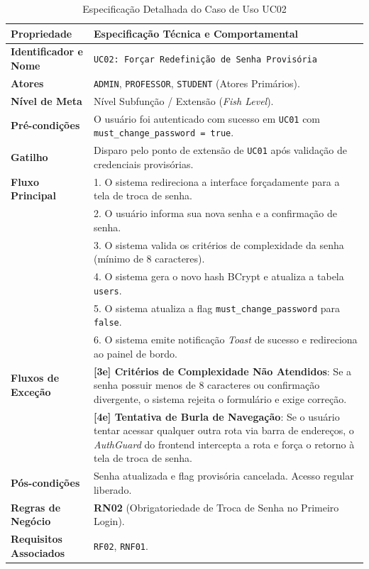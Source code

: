 \begin{table}[!ht]
\centering
\caption{Especificação Detalhada do Caso de Uso UC02}
\label{tab_uc02}
\footnotesize
\begin{tabularx}{\textwidth}{p{3.5cm} X}
\toprule
\textbf{Propriedade} & \textbf{Especificação Técnica e Comportamental} \\
\midrule
\textbf{Identificador e Nome} & \texttt{UC02: Forçar Redefinição de Senha Provisória} \\
\textbf{Atores} & \texttt{ADMIN}, \texttt{PROFESSOR}, \texttt{STUDENT} (Atores Primários). \\
\textbf{Nível de Meta} & Nível Subfunção / Extensão (\textit{Fish Level}). \\
\textbf{Pré-condições} & O usuário foi autenticado com sucesso em \texttt{UC01} com \texttt{must\_change\_password = true}. \\
\textbf{Gatilho} & Disparo pelo ponto de extensão de \texttt{UC01} após validação de credenciais provisórias. \\
\textbf{Fluxo Principal} & 
1. O sistema redireciona a interface forçadamente para a tela de troca de senha.\\
& 2. O usuário informa sua nova senha e a confirmação de senha.\\
& 3. O sistema valida os critérios de complexidade da senha (mínimo de 8 caracteres).\\
& 4. O sistema gera o novo hash BCrypt e atualiza a tabela \texttt{users}.\\
& 5. O sistema atualiza a flag \texttt{must\_change\_password} para \texttt{false}.\\
& 6. O sistema emite notificação \textit{Toast} de sucesso e redireciona ao painel de bordo. \\
\textbf{Fluxos de Exceção} & 
\textbf{[3e] Critérios de Complexidade Não Atendidos}: Se a senha possuir menos de 8 caracteres ou confirmação divergente, o sistema rejeita o formulário e exige correção.\\
& \textbf{[4e] Tentativa de Burla de Navegação}: Se o usuário tentar acessar qualquer outra rota via barra de endereços, o \textit{AuthGuard} do frontend intercepta a rota e força o retorno à tela de troca de senha. \\
\textbf{Pós-condições} & Senha atualizada e flag provisória cancelada. Acesso regular liberado. \\
\textbf{Regras de Negócio} & \textbf{RN02} (Obrigatoriedade de Troca de Senha no Primeiro Login). \\
\textbf{Requisitos Associados} & \texttt{RF02}, \texttt{RNF01}. \\
\bottomrule
\end{tabularx}
\end{table}

